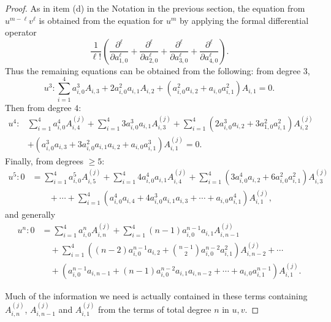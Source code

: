 \documentclass[12pt]{amsart}
\theoremstyle{theorem}
\begin{document}
\begin{proof}
As in item (d) in the Notation in the previous section, the equation from $u^{m - \ell} v^\ell$
is obtained from the equation for $u^m$ by applying the formal differential operator
$$\frac{1}{\ell!}\left(\frac{\partial^\ell}{\partial a_{1,0}^\ell} +  \frac{\partial^\ell}{\partial a_{2,0}^\ell} + \frac{\partial^\ell}{\partial a_{3,0}^\ell} + \frac{\partial^\ell}{\partial a_{4,0}^\ell}\right).$$
Thus the remaining equations can be obtained from the following:  from degree $3$, 
$$u^3:  \sum_{i=1}^4 a_{i,0}^3 A_{i,3} + 2 a_{i,0}^2 a_{i,1}  A_{i,2} + (a_{i,0}^2 a_{i,2} + a_{i,0} a_{i,1}^2) A_{i,1}  = 0.$$
Then from degree $4$:
\begin{align*}
u^4:  &\sum_{i=1}^4 a_{i,0}^4 A_{i,4}^{(j)} + \sum_{i=1}^4 3 a_{i,0}^3 a_{i,1} A_{i,3}^{(j)} + \sum_{i=1}^4 (2 a_{i,0}^3 a_{i, 2} + 3 a_{1, 0}^2 a_{i,1}^2) A_{i,2}^{(j)}\\
        & + (a_{i,0}^3 a_{i,3} + 3 a_{i,0}^2 a_{i,1}a_{i,2} + a_{i,0} a_{i,1}^3) A_{i,1}^{(j)} = 0.
 \end{align*}
Finally, from degrees $\ge 5$:
\begin{align*}
u^5: 0 &= \sum_{i=1}^4 a_{i,0}^5 A_{i,5}^{(j)} + \sum_{i=1}^4 4 a_{i,0}^4 a_{i,1} A_{i,4}^{(j)} + \sum_{i=1}^4 (3 a_{i,0}^4 a_{i,2} + 6 a_{i,0}^2 a_{i,1}^2) A_{i,3}^{(j)} \\
           &\qquad + \cdots  + \sum_{i=1}^4 (a_{i,0}^4 a_{i,4} + 4 a_{i,0}^3 a_{i,1} a_{i,3} + \cdots + a_{i,0} a_{i,1}^4) A_{i,1}^{(j)},
\end{align*}
and generally
\begin{align}
\label{HigherDegrees}
u^n: 0&= \sum_{i=1}^4 a_{i,0}^n A_{i,n}^{(j)} + \sum_{i=1}^4 (n-1) a_{i,0}^{n-1} a_{i,1} A_{i,n-1}^{(j)}\nonumber \\ 
& \quad + \sum_{i=1}^4 \left((n-2) a_{i,0}^{n-1} a_{i,2} + \binom{n-1}{2}  a_{i,0}^{n-2} a_{i,1}^2\right) A_{i,n-2}^{(j)} + \cdots  \\
& \quad + (a_{i,0}^{n-1} a_{i,n-1} + (n-1) a_{i,0}^{n-2} a_{i,1} a_{i,n-2 }+ \cdots  + a_{i,0} a_{i,1}^{n-1}) A_{i,1}^{(j)}.\nonumber
\end{align}

Much of the information we need is actually contained in these terms containing $A_{i,n}^{(j)}$, $A_{i,n-1}^{(j)}$ and $A_{i,1}^{(j)}$ from the terms of total degree $n$ in $u,v$.  


\end{proof}
\end{document}
